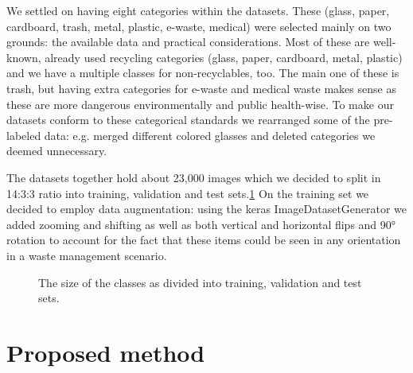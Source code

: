 \documentclass{article}
\begin{document}
	We settled on having eight categories within the datasets. These (glass, paper, cardboard, trash, metal, plastic, e-waste, medical) were selected mainly on two grounds: the available data and practical considerations. Most of these are well-known, already used recycling categories (glass, paper, cardboard, metal, plastic) and we have a multiple classes for non-recyclables, too. The main one of these is trash, but having extra categories for e-waste and medical waste makes sense as these are more dangerous environmentally and public health-wise. To make our datasets conform to these categorical standards we rearranged some of the pre-labeled data: e.g. merged different colored glasses and deleted categories we deemed unnecessary.
	
	The datasets together hold about 23,000 images which we decided to split in 14:3:3 ratio into training, validation and test sets.\ref{dataset} On the training set we decided to employ data augmentation: using the keras ImageDatasetGenerator we added zooming and shifting as well as both vertical and horizontal flips and 90° rotation to account for the fact that these items could be seen in any orientation in a waste management scenario.
	
	\begin{figure}
		\centering
		\caption{The size of the classes as divided into training, validation and test sets.}
		\label{dataset}
	\end{figure}
	
	\section{Proposed method}
	
\end{document}
